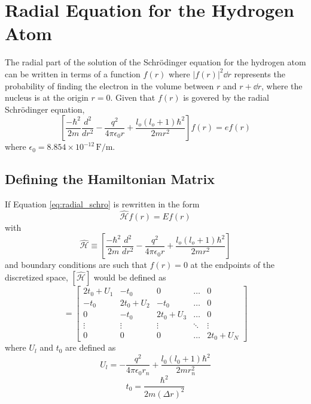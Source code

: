 \documentclass[a4paper, 10pt]{article}
\newcommand{\ham}{\hat{\mathcal{H}}}
\begin{document}
\section{Radial Equation for the Hydrogen Atom}
The radial part of the solution of the Schrödinger equation for the hydrogen atom can be written in terms of a function $f(r)$ where $|f(r)|^2 \dd{r}$ represents the probability of finding the electron in the volume between $r$ and $r + \dd{r}$, where the nucleus is at the origin $r = 0$. Given that $f(r)$ is govered by the radial Schrödinger equation,
\begin{equation}\label{eq:radial_schro}
    \left[ \frac{-\hbar^2}{2m} \frac{d^2}{dr^2} - \frac{q^2}{4\pi\epsilon_0 r} + \frac{l_o(l_o + 1)\hbar^2}{2mr^2} \right] f(r) = ef(r)
\end{equation}
where $\epsilon_0 = 8.854 \times 10^{-12}\,\unit{\farad\per\meter}$.

\subsection{Defining the Hamiltonian Matrix}
If Equation \ref{eq:radial_schro} is rewritten in the form
\begin{equation}
	\ham f(r) = E f(r)
\end{equation}
with
\begin{equation}
	\ham \equiv \left[ \frac{-\hbar^2}{2m} \frac{d^2}{dr^2} - \frac{q^2}{4\pi\epsilon_0 r} + \frac{l_o(l_o + 1)\hbar^2}{2mr^2} \right]
\end{equation}
and boundary conditions are such that $f(r) = 0$ at the endpoints of the discretized space, $[\ham]$ would be defined as
\begin{equation}
[\hat{H}] =
\begin{bmatrix}
2t_0 + U_1 & -t_0 & 0 & \dots & 0 \\
-t_0 & 2t_0 + U_2 & -t_0 & \dots & 0 \\
0 & -t_0 & 2t_0 + U_3 & \dots & 0 \\
\vdots & \vdots & \vdots & \ddots & \vdots \\
0 & 0 & 0 & \dots & 2t_0 + U_N
\end{bmatrix}
\end{equation}
where $U_l$ and $t_0$ are defined as
\begin{equation}
    U_l = -\frac{q^2}{4\pi\epsilon_0 r_n} + \frac{l_0(l_0 + 1)\hbar^2}{2mr_n^2}
\end{equation}
\begin{equation}
    t_0 = \frac{\hbar^2}{2m(\Delta r)^2}
\end{equation}
\end{document}
